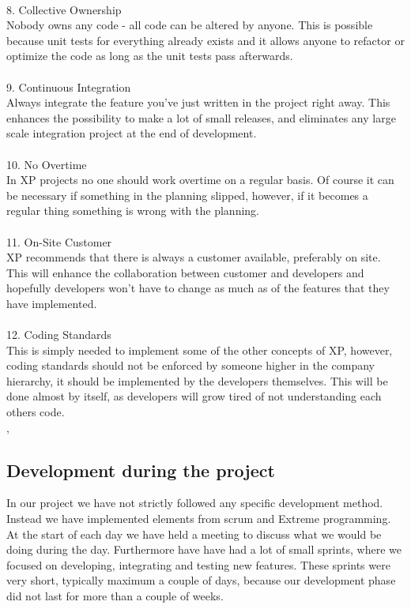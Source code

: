 \begin{itemize}
\\
8. Collective Ownership\\
Nobody owns any code - all code can be altered by anyone. This is possible because unit tests for everything already exists and it allows anyone to refactor or optimize the code as long as the unit tests pass afterwards.\\
\\
9. Continuous Integration\\
Always integrate the feature you've just written in the project right away. This enhances the possibility to make a lot of small releases, and eliminates any large scale integration project at the end of development.\\
\\
10. No Overtime\\
In XP projects no one should work overtime on a regular basis. Of course it can be necessary if something in the planning slipped, however, if it becomes a regular thing something is wrong with the planning.\\
\\
11. On-Site Customer\\
XP recommends that there is always a customer available, preferably on site. This will enhance the collaboration between customer and developers and hopefully developers won't have to change as much as of the features that they have implemented.\\
\\
12. Coding Standards\\
This is simply needed to implement some of the other concepts of XP, however, coding standards should not be enforced by someone higher in the company hierarchy, it should be implemented by the developers themselves. This will be done almost by itself, as developers will grow tired of not understanding each others code. \\

\cite{xp}, \cite{xp2}
\subsection{Development during the project}
In our project we have not strictly followed any specific development method. Instead we have implemented elements from scrum and Extreme programming. At the start of each day we have held a meeting to discuss what we would be doing during the day. Furthermore have have had a lot of small sprints, where we focused on developing, integrating and testing new features. These sprints were very short, typically maximum a couple of days, because our development phase did not last for more than a couple of weeks.


\end{itemize}
